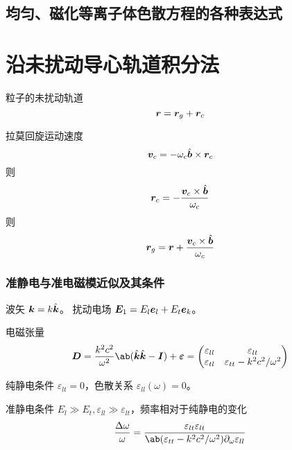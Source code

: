 \subsection{均匀、磁化等离子体色散方程的各种表达式}

\section{沿未扰动导心轨道积分法}

粒子的未扰动轨道
\begin{equation}
\bm{r} = \bm{r}_g + \bm{r}_c
\end{equation}

拉莫回旋运动速度
\begin{equation}
\bm{v}_c = - \omega_c \hat{\bm{b}} \times \bm{r}_c
\end{equation}
则
\begin{equation}
\bm{r}_c = - \frac{\bm{v}_c \times \hat{\bm{b}}}{\omega_c}
\end{equation}
则
\begin{equation}
\bm{r}_g = \bm{r} + \frac{\bm{v}_c \times \hat{\bm{b}}}{\omega_c}
\end{equation}


\subsubsection{准静电与准电磁模近似及其条件}

波矢 $\bm{k} = k \hat{\bm{k}}$。
扰动电场 $\bm{E}_1 = E_l \bm{e}_l + E_t \bm{e}_k$。

电磁张量
\begin{equation}
\vector{D} = \frac{k^2 c^2}{\omega^2} \ab(\hat{\vector{k}}\hat{\vector{k}}
- \vector{I}) + \vector{\varepsilon}
= \begin{pmatrix}
    \varepsilon_{ll} & \varepsilon_{lt} \\
    \varepsilon_{tl} & \varepsilon_{tt} - k^2 c^2 / \omega^2
\end{pmatrix}
\end{equation}

纯静电条件 $\varepsilon_{lt} = 0$，色散关系 $\varepsilon_{ll}(\omega) = 0$。

准静电条件 $E_l \gg E_t, \varepsilon_{ll} \gg \varepsilon_{lt}$，频率相对于纯静电的变化
\begin{equation}
\frac{\Delta\omega}{\omega}
=\frac{\varepsilon_{lt} \varepsilon_{lt}}
{\ab(\varepsilon_{tt} - k^2 c^2 / \omega^2) \pdv{\varepsilon_{ll}}!{\omega}}
\end{equation}

